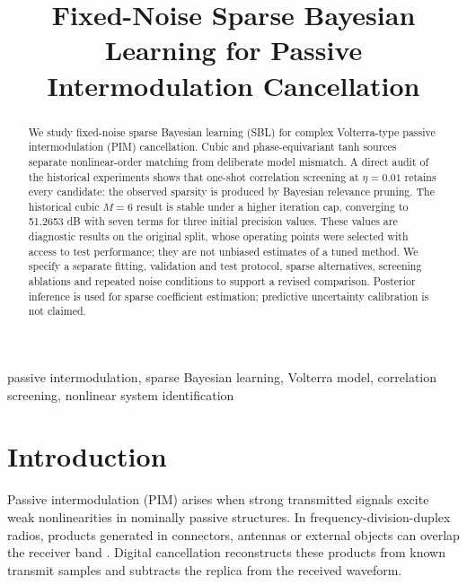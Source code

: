\documentclass[conference]{IEEEtran}
\begin{document}

\title{Fixed-Noise Sparse Bayesian Learning for Passive Intermodulation Cancellation}

\author{}

\maketitle

\begin{abstract}
We study fixed-noise sparse Bayesian learning (SBL) for complex Volterra-type passive intermodulation (PIM) cancellation. Cubic and phase-equivariant tanh sources separate nonlinear-order matching from deliberate model mismatch. A direct audit of the historical experiments shows that one-shot correlation screening at $\eta=0.01$ retains every candidate: the observed sparsity is produced by Bayesian relevance pruning. The historical cubic $M=6$ result is stable under a higher iteration cap, converging to 51.2653 dB with seven terms for three initial precision values. These values are diagnostic results on the original split, whose operating points were selected with access to test performance; they are not unbiased estimates of a tuned method. We specify a separate fitting, validation and test protocol, sparse alternatives, screening ablations and repeated noise conditions to support a revised comparison. Posterior inference is used for sparse coefficient estimation; predictive uncertainty calibration is not claimed.
\end{abstract}
\begin{IEEEkeywords}
passive intermodulation, sparse Bayesian learning, Volterra model, correlation screening, nonlinear system identification
\end{IEEEkeywords}

\section{Introduction}\label{sec:intro}
Passive intermodulation (PIM) arises when strong transmitted signals excite weak nonlinearities in nominally passive structures. In frequency-division-duplex radios, products generated in connectors, antennas or external objects can overlap the receiver band \cite{Lui1990PIM,Lampu2021AirInduced,Lampu2023Algorithms,Ahmmed2023Overview}. Digital cancellation reconstructs these products from known transmit samples and subtracts the replica from the received waveform.
\end{document}
